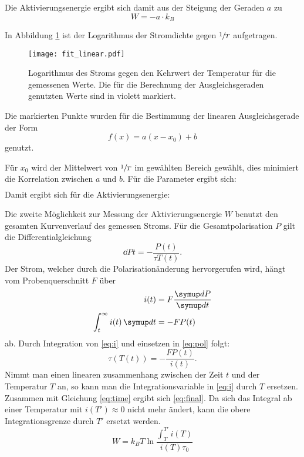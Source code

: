Die Aktivierungsenergie ergibt sich damit aus der Steigung der Geraden $a$ zu
\begin{equation}
  W = - a \cdot k_B
\end{equation}

In Abbildung \ref{fig:lnj} ist der Logarithmus der Stromdichte gegen $\sfrac{1}{T}$ aufgetragen.

\begin{figure}
  \texttt{[image: fit\_linear.pdf]}
  \caption{%
    Logarithmus des Stroms gegen den Kehrwert der Temperatur für die gemessenen Werte.
    Die für die Berechnung der Ausgleichsgeraden genutzten Werte sind in violett markiert.
  }
  \label{fig:lnj}
\end{figure}

Die markierten Punkte wurden für die Bestimmung der linearen Ausgleichsgerade der Form
\begin{equation}
  f(x) = a (x - x_0) + b
\end{equation}
genutzt.

Für $x_0$ wird der Mittelwert von $\sfrac{1}{T}$ im gewählten Bereich gewählt, dies minimiert die Korrelation zwischen $a$ und $b$.
Für die Parameter ergibt sich:
\begin{align}
  
\end{align}
Damit ergibt sich für die Aktivierungsenergie:
\begin{equation}
  
\end{equation}

Die zweite Möglichkeit zur Messung der Aktivierungsenergie $W$ benutzt den gesamten Kurvenverlauf des gemessen Stroms.
Für die Gesamtpolarisation $P$ gilt die Differentialgleichung
\begin{equation}
  \dd{P}{t} = - \frac{P(t)}{\tau{T(t)}}.
  \label{eq:pol}
\end{equation}
Der Strom, welcher durch die Polarisationänderung hervorgerufen wird, hängt vom Probenquerschnitt $F$ über
\begin{align}
  i(t) &= F \dd{P}{t} \\
  \int_t^{\infty} i(t) \dif{t} &= -FP(t)
  \label{eq:i}
\end{align}
ab.
Durch Integration von  \eqref{eq:i} und einsetzen in \eqref{eq:pol} folgt:
\begin{equation}
  \tau(T(t)) = -\frac{F P(t)}{i(t)}.
  \label{eq:tau_t}
\end{equation}
Nimmt man einen linearen zusammenhang zwischen der Zeit $t$ und der Temperatur $T$ an, so kann man die Integrationsvariable in \eqref{eq:i} durch $T$ ersetzen.
Zusammen mit Gleichung \eqref{eq:time} ergibt sich \eqref{eq:final}. Da sich das Integral ab einer Temperatur mit $i(T') \approx 0$ nicht mehr ändert,
kann die obere Integrationsgrenze durch $T'$ ersetzt werden.
\begin{equation}
  W = k_B T \ln \frac{\int_T^{T'} i(T)}{ i(T) \tau_0}
  \label{eq:final}
\end{equation}


